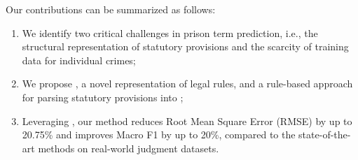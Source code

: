 Our contributions can be summarized as follows: 
\begin{enumerate}
\item We identify two critical challenges in prison term prediction, i.e., the structural representation of statutory provisions and the scarcity of training data for individual crimes;
\item We propose \lawgraph, a novel representation of legal rules, and a rule-based approach for parsing statutory provisions into ; 
\item  Leveraging , our method reduces Root Mean Square Error (RMSE) by up to 20.75\% and improves Macro F1 by up to 20\%, compared to the state-of-the-art methods on real-world judgment datasets.
\end{enumerate}



